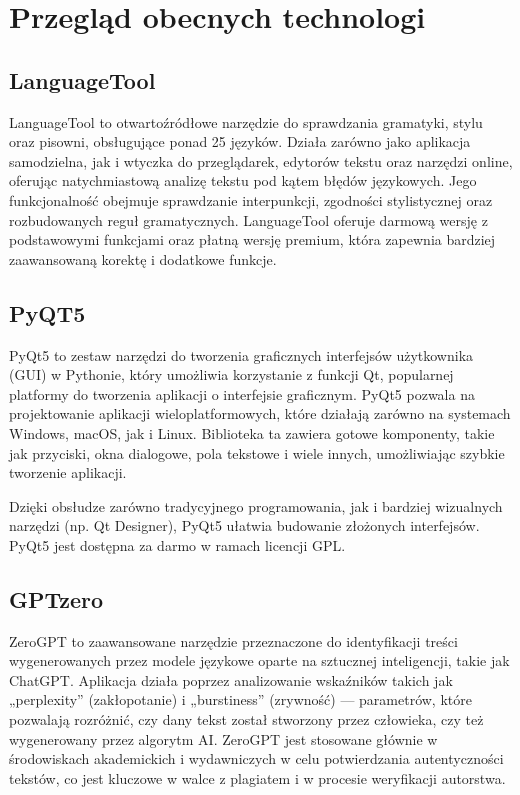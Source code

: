 \chapter{Przegląd obecnych technologi}
\label{chap:przeglad}

\section{LanguageTool}
LanguageTool to otwartoźródłowe narzędzie do sprawdzania gramatyki, stylu oraz pisowni, obsługujące ponad 25 języków. Działa zarówno jako aplikacja samodzielna, jak i wtyczka do przeglądarek, edytorów tekstu oraz narzędzi online, oferując natychmiastową analizę tekstu pod kątem błędów językowych. Jego funkcjonalność obejmuje sprawdzanie interpunkcji, zgodności stylistycznej oraz rozbudowanych reguł gramatycznych. LanguageTool oferuje darmową wersję z podstawowymi funkcjami oraz płatną wersję premium, która zapewnia bardziej zaawansowaną korektę i dodatkowe funkcje.

\section{PyQT5}
PyQt5 to zestaw narzędzi do tworzenia graficznych interfejsów użytkownika (GUI) w Pythonie, który umożliwia korzystanie z funkcji Qt, popularnej platformy do tworzenia aplikacji o interfejsie graficznym. PyQt5 pozwala na projektowanie aplikacji wieloplatformowych, które działają zarówno na systemach Windows, macOS, jak i Linux. Biblioteka ta zawiera gotowe komponenty, takie jak przyciski, okna dialogowe, pola tekstowe i wiele innych, umożliwiając szybkie tworzenie aplikacji.

Dzięki obsłudze zarówno tradycyjnego programowania, jak i bardziej wizualnych narzędzi (np. Qt Designer), PyQt5 ułatwia budowanie złożonych interfejsów. PyQt5 jest dostępna za darmo w ramach licencji GPL.

\section{GPTzero}
ZeroGPT to zaawansowane narzędzie przeznaczone do identyfikacji treści wygenerowanych przez modele językowe oparte na sztucznej inteligencji, takie jak ChatGPT. Aplikacja działa poprzez analizowanie wskaźników takich jak „perplexity” (zakłopotanie) i „burstiness” (zrywność) — parametrów, które pozwalają rozróżnić, czy dany tekst został stworzony przez człowieka, czy też wygenerowany przez algorytm AI. ZeroGPT jest stosowane głównie w środowiskach akademickich i wydawniczych w celu potwierdzania autentyczności tekstów, co jest kluczowe w walce z plagiatem i w procesie weryfikacji autorstwa.

